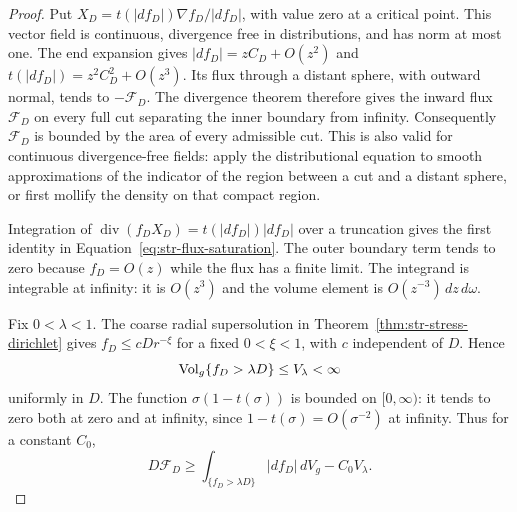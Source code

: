 \begin{proof}
Put $X_D=t(|df_D|)\nabla f_D/|df_D|$, with value zero at a critical
point. This vector field is continuous, divergence free in
distributions, and has norm at most one. The end expansion gives
$|df_D|=zC_D+O(z^2)$ and $t(|df_D|)=z^2C_D^2+O(z^3)$. Its flux
through a distant sphere, with outward normal, tends to
$-\mathcal F_D$. The divergence theorem therefore gives the inward
flux $\mathcal F_D$ on every full cut separating the inner boundary
from infinity. Consequently $\mathcal F_D$ is bounded by the area of
every admissible cut. This is also valid for continuous divergence-free
fields: apply the distributional equation to smooth approximations of
the indicator of the region between a cut and a distant sphere, or
first mollify the density on that compact region.

Integration of $\operatorname{div}(f_DX_D)=t(|df_D|)|df_D|$ over a
truncation gives the first identity in
Equation~\eqref{eq:str-flux-saturation}. The outer boundary term tends
to zero because $f_D=O(z)$ while the flux has a finite limit. The
integrand is integrable at infinity: it is $O(z^3)$ and the volume
element is $O(z^{-3})\,dz\,d\omega$.

Fix $0<\lambda<1$. The coarse radial supersolution in
Theorem~\ref{thm:str-stress-dirichlet} gives
$f_D\leq cD r^{-\xi}$ for a fixed $0<\xi<1$, with $c$ independent
of $D$. Hence
\begin{equation}
 \operatorname{Vol}_g\{f_D>\lambda D\}\leq V_\lambda<\infty
 \label{eq:str-superlevel-volume}
\end{equation}
uniformly in $D$. The function $\sigma(1-t(\sigma))$ is bounded on
$[0,\infty)$: it tends to zero both at zero and at infinity, since
$1-t(\sigma)=O(\sigma^{-2})$ at infinity. Thus for a constant $C_0$,
\[
 D\mathcal F_D
 \geq\int_{\{f_D>\lambda D\}}|df_D|\,dV_g-C_0V_\lambda.
\]


\end{proof}
